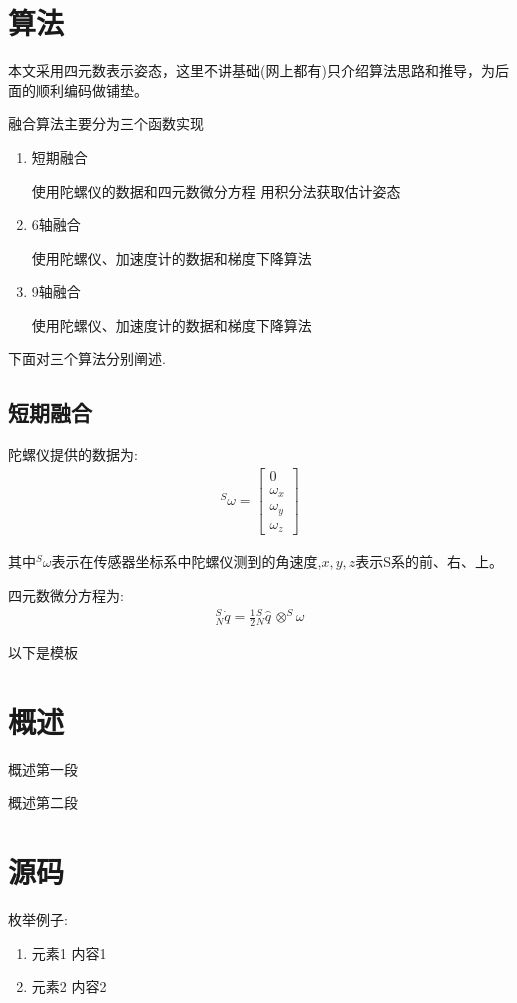 \documentclass[12pt,a4paper]{article}
\begin{document}
\section{算法}
本文采用四元数表示姿态，这里不讲基础(网上都有)只介绍算法思路和推导，为后面的顺利编码做铺垫。

融合算法主要分为三个函数实现
\begin{enumerate}
    \item 短期融合

        使用陀螺仪的数据和四元数微分方程 用积分法获取估计姿态
    \item 6轴融合

        使用陀螺仪、加速度计的数据和梯度下降算法
    \item 9轴融合

        使用陀螺仪、加速度计的数据和梯度下降算法
\end{enumerate}
下面对三个算法分别阐述.

\subsection{短期融合}
陀螺仪提供的数据为:
\begin{eqnarray}
^S\omega
=
\left[\begin{array}{c} 
    0 \\
    \omega_{x} \\
    \omega_{y} \\
    \omega_{z}
\end{array}
\right]
\end{eqnarray}

其中$^S\omega$表示在传感器坐标系中陀螺仪测到的角速度,$x,y,z$表示S系的前、右、上。

四元数微分方程为:
\begin{eqnarray}
    ^S_N\dot{q}=\frac{1}{2}{^S_N\hat{q}}\,\otimes^S\omega
\end{eqnarray}

\newpage
以下是模板
\section{概述}
概述第一段

概述第二段
\section{源码} 
枚举例子:

\begin{enumerate}
    \item 元素1
        内容1
    \item 元素2
        内容2
\end{enumerate}
\end{document}
